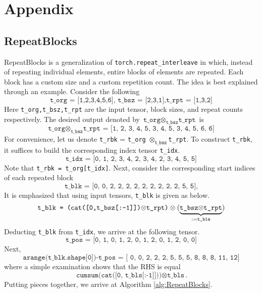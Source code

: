 \documentclass{article}
\newcommand{\py}[1]{\texttt{#1}}
\begin{document}
    
\newpage 
\section{Appendix}
\subsection{RepeatBlocks}\label{sec:RepeatBlocks}
RepeatBlocks is a generalization of \py{torch.repeat\_interleave} in which, instead of repeating individual elements, entire blocks of elements are repeated. Each block has a custom size and a custom repetition count.  The idea is best explained through an example. Consider the following
 \[
\py{t\_org = [1,2,3,4,5,6], t\_bsz = [2,3,1],t\_rpt = [1,3,2]}
 \]
Here \py{t\_org,t\_bsz,t\_rpt} are the input tensor, block sizes, and repeat counts respectively. The desired output denoted by $\py{t\_org} \otimes_{\py{t\_bsz}}\py{t\_rpt}$ is 
\[
\py{t\_org} \otimes_{\py{t\_bsz}}\py{t\_rpt = [1, 2, 3, 4, 5, 3, 4, 5, 3, 4, 5, 6, 6]}
\]
For convenience, let us denote \py{t\_rbk} = \py{t\_org} $\otimes_{\py{t\_bsz}}$\py{t\_rpt}.
To construct \py{t\_rbk}, it suffices to build the corresponding index tensor \py{t\_idx}.
\[
\py{t\_idx = [0, 1, 2, 3, 4, 2, 3, 4, 2, 3, 4, 5, 5]}
\]
Note that \py{t\_rbk = t\_org[t\_idx]}. Next, consider the corresponding start indices of each repeated block 
\[
\py{t\_blk = [0, 0, 2, 2, 2, 2, 2, 2, 2, 2, 2, 5, 5],}
\]
It is emphasized that using input tensors, \py{t\_blk} is given as below.
\[
 \py{t\_blk = (cat([0,t\_bsz[:-1]])$\otimes$\py{t\_rpt})}\otimes (\underbrace{\py{t\_bsz$\otimes$t\_rpt}}_{:=\py{t\_bls}}) 
\]
Deducting \py{t\_blk} from \py{t\_idx}, we arrive at the following tensor.
\[
\py{t\_pos = [0, 1, 0, 1, 2, 0, 1, 2, 0, 1, 2, 0, 0]}
\]
Next, 
\[
\py{arange(t\_blk.shape[0])-t\_pos = [ 0,  0,  2,  2,  2,  5,  5,  5,  8,  8,  8, 11, 12]}
\]
 where a simple examination shows that the RHS is equal
\[
\py{cumsum(cat([0, t\_bls[:-1]]))$\otimes$t\_bls}.
\]
Putting pieces together, we arrive at Algorithm \ref{alg:RepeatBlocks}.
\end{document}
